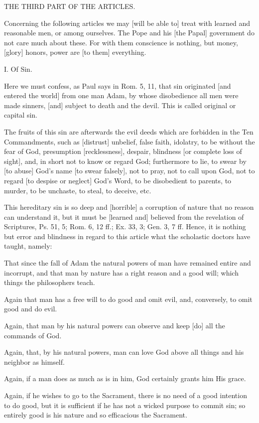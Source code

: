 THE THIRD PART OF THE ARTICLES.

Concerning the following articles we may [will be able to]
treat with learned and reasonable men, or among ourselves. The
Pope and his [the Papal] government do not care much about
these. For with them conscience is nothing, but money, [glory]
honors, power are [to them] everything.

I. Of Sin.

Here we must confess, as Paul says in Rom. 5, 11, that sin
originated [and entered the world] from one man Adam, by whose
disobedience all men were made sinners, [and] subject to death
and the devil. This is called original or capital sin.

The fruits of this sin are afterwards the evil deeds which are
forbidden in the Ten Commandments, such as [distrust]
unbelief, false faith, idolatry, to be without the fear of
God, presumption [recklessness], despair, blindness [or
complete loss of sight], and, in short not to know or regard
God; furthermore to lie, to swear by [to abuse] God's name [to
swear falsely], not to pray, not to call upon God, not to
regard [to despise or neglect] God's Word, to be disobedient
to parents, to murder, to be unchaste, to steal, to deceive,
etc.

This hereditary sin is so deep and [horrible] a corruption of
nature that no reason can understand it, but it must be
[learned and] believed from the revelation of Scriptures, Ps.
51, 5; Rom. 6, 12 ff.; Ex. 33, 3; Gen. 3, 7 ff. Hence, it is
nothing but error and blindness in regard to this article what
the scholastic doctors have taught, namely:

That since the fall of Adam the natural powers of man have
remained entire and incorrupt, and that man by nature has a
right reason and a good will; which things the philosophers
teach.

Again that man has a free will to do good and omit evil, and,
conversely, to omit good and do evil.

Again, that man by his natural powers can observe and keep
[do] all the commands of God.

Again, that, by his natural powers, man can love God above all
things and his neighbor as himself.

Again, if a man does as much as is in him, God certainly
grants him His grace.

Again, if he wishes to go to the Sacrament, there is no need
of a good intention to do good, but it is sufficient if he has
not a wicked purpose to commit sin; so entirely good is his
nature and so efficacious the Sacrament.

